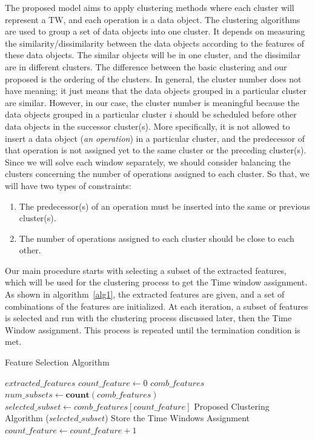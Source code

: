 \documentclass[runningheads]{llncs}
\begin{document}
The proposed model aims to apply clustering methods where each cluster will represent a TW, and each operation is a data object. The clustering algorithms are used to group a set of data objects into one cluster. It depends on measuring the similarity/dissimilarity between the data objects according to the features of these data objects. The similar objects will be in one cluster, and the dissimilar are in different clusters. The difference between the basic clustering and our proposed is the ordering of the clusters. In general, the cluster number does not have meaning; it just means that the data objects grouped in a particular cluster are similar. However, in our case, the cluster number is meaningful because the data objects grouped in a particular cluster $i$ should be scheduled before other data objects in the successor cluster(s). More specifically, it is not allowed to insert a data object (\textit{an operation}) in a particular cluster, and the predecessor of that operation is not assigned yet to the same cluster or the preceding cluster(s). Since we will solve each window separately, we should consider balancing the clusters concerning the number of operations assigned to each cluster. So that, we will have two types of constraints:
\begin{enumerate}
\item The predecessor(s) of an operation must be inserted into the same or previous cluster(s).
\item The number of operations assigned to each cluster should be close to each other.
\end{enumerate}

Our main procedure starts with selecting a subset of the extracted features, which will be used for the clustering process to get the Time window assignment. As shown in algorithm~\ref{alg1}, the extracted features are given, and a set of combinations of the features are initialized. At each iteration, a subset of features is selected and run with the clustering process discussed later, then the Time Window assignment. This process is repeated until the termination condition is met.

\begin{algorithm}
\caption{Feature Selection Algorithm}\label{alg1}
\begin{algorithmic}
\Require $extracted\_features$
\State $count\_feature \gets 0$
\State $comb\_features$ 
\State $num\_subsets \gets \textbf{count}(comb\_features)$
	\State $selected\_subset \gets comb\_features[count\_feature]$
	\State Proposed Clustering Algorithm ($selected\_subset$)  %
	\State Store the Time Windows Assignment
	\State $count\_feature \gets count\_feature + 1$
\EndWhile

\end{algorithmic}
\end{algorithm}
\end{document}
